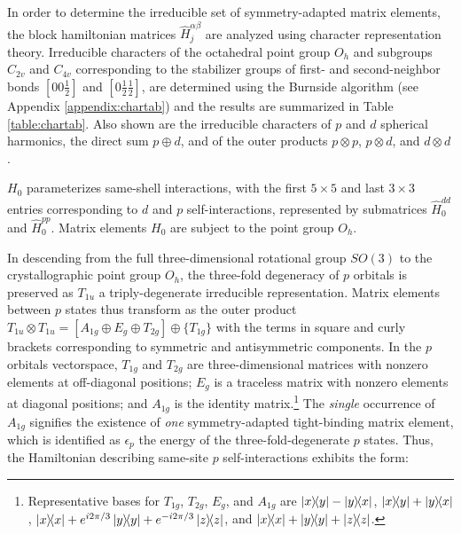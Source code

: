 \documentclass[twocolumn,showpacs,preprintnumbers,superscriptaddress,prb,floatfix,aps,10pt]{revtex4-1}
\newcommand*{\ham}{\hat{H}}
\newcommand*{\x}{\times}
\begin{document}
In order to determine the irreducible set of symmetry-adapted matrix elements, the block hamiltonian matrices $\ham_{j}^{\alpha\beta}$ are analyzed using character representation theory. 
Irreducible characters of the octahedral point group $O_h$ and subgroups $C_{2v}$ and $C_{4v}$ corresponding to the stabilizer groups of first- and second-neighbor bonds $[0 0 \frac{1}{2}]$ and $[0 \frac{1}{2} \frac{1}{2}]$, are determined using the Burnside algorithm (see Appendix \ref{appendix:chartab}) and the results are summarized in Table \ref{table:chartab}. Also shown are the irreducible characters of $p$ and $d$ spherical harmonics, the direct sum $p \oplus d$, and of the outer products $p \otimes p$, $p \otimes d$, and $d \otimes d$.

$H_0$ parameterizes same-shell interactions, with the first $5\x5$ and last $3\x3$ entries corresponding to $d$ and $p$ self-interactions, represented by submatrices $\hat{H}_0^{dd}$ and $\hat{H}_0^{pp}$. Matrix elements $H_0$ are subject to the point group $O_h$.

In descending from the full three-dimensional rotational group $SO(3)$ to the crystallographic point group $O_h$, the three-fold degeneracy of $p$ orbitals is preserved as $T_{1u}$ a triply-degenerate irreducible representation. Matrix elements between $p$ states thus transform as the outer product $T_{1u} \otimes T_{1u} = [A_{1g} \oplus E_g \oplus T_{2g}] \oplus \{T_{1g}\}$ with the terms in square and curly brackets corresponding to symmetric and antisymmetric components. In the $p$ orbitals vectorspace, $T_{1g}$ and $T_{2g}$ are three-dimensional matrices with nonzero elements at off-diagonal positions; $E_g$ is a traceless matrix with nonzero elements at diagonal positions; and $A_{1g}$ is the identity matrix.\footnote{Representative bases for $T_{1g}$, $T_{2g}$, $E_g$, and $A_{1g}$ are $\ketbra{x}{y} - \ketbra{y}{x}$, $\ketbra{x}{y} + \ketbra{y}{x}$, $\ketbra{x}{x} + e^{i2\pi/3}\ketbra{y}{y} + e^{-i2\pi/3}\ketbra{z}{z}$, and $\ketbra{x}{x} + \ketbra{y}{y} + \ketbra{z}{z}$.} The \emph{single} occurrence of $A_{1g}$ signifies the existence of \emph{one} symmetry-adapted tight-binding matrix element, which is identified as $\epsilon_p$ the energy of the three-fold-degenerate $p$ states. Thus, the Hamiltonian describing same-site $p$ self-interactions exhibits the form:
\end{document}
